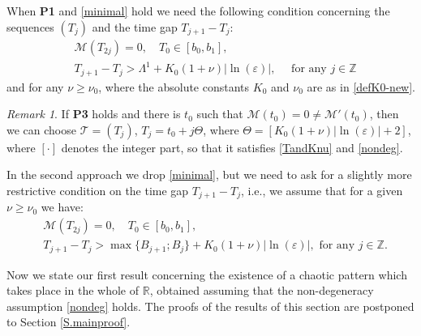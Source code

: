 \documentclass[10pt]{article}
\numberwithin{equation}{section}
\def\ep{\varepsilon}
\def\Z{{\mathbb Z}}
\def\R{{\mathbb R}}
\def\MM{{\mathcal M}}
\def\TT{{\mathcal T}}
\def\l1{\Lambda^{1}}
\def\ogap{\Theta}   %
\newcommand\assump[1]{{\rm\textbf{#1}}}
\theoremstyle{definition}
\theoremstyle{remark}
\newtheorem{remark}[theorem]{Remark}
\begin{document}
When  \assump{P1} and \eqref{minimal} hold we need the following condition concerning the sequences $(T_j)$ and the time gap
$T_{j+1}-T_j$:
\begin{equation}\label{TandKnu}
\begin{split}
  &  \MM(T_{2j})=0, \quad T_0 \in [b_0,b_1],\\
& T_{j+1}-T_j > \l1 + K_0 (1+\nu) |\ln(\ep)| ,   \quad \textrm{ for any $j \in \Z$}
  \end{split}
\end{equation}
and for any $\nu \ge \nu_0$, where the absolute constants $K_0$ and $\nu_0$ are as in \eqref{defK0-new}.

\begin{remark}
 If \assump{P3} holds and there is $t_0$ such that $\MM(t_0)=0 \ne \MM'(t_0)$,
  then we can choose  $\TT=(T_j)$, $T_j=t_0+j \ogap$, where $\ogap=     \left[  K_0(1+\nu) |\ln(\ep)|    +2 \right]$, where $[\cdot]$
  denotes the integer part,
  so that it satisfies \eqref{TandKnu} and \eqref{nondeg}.
\end{remark}


In the second approach we drop \eqref{minimal}, but
we need to ask for a slightly more restrictive condition on  the time gap
$T_{j+1}-T_j$, i.e., we assume that for a given  $\nu \ge \nu_0$ we have:
\begin{equation}\label{TandKnunew}
\begin{split}
  &  \MM(T_{2j})=0, \quad T_0 \in [b_0,b_1],\\
& T_{j+1}-T_j >    \max\{ B_{j+1}; B_{j}\}+ K_0 (1+\nu) |\ln(\ep)| ,   \textrm{ for any $j \in \Z$.}
  \end{split}
\end{equation}



 Now we state our first result concerning the existence of a chaotic pattern which takes place in the whole of $\R$,
obtained assuming  that the non-degeneracy assumption \eqref{nondeg} holds.  The  proofs of the results of this section are postponed to Section \ref{S.mainproof}.
\end{document}
